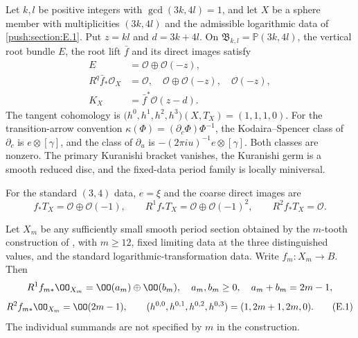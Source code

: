 \begin{theorem}\hypertarget{tag-032U}{}\label{push:src:E.2.1}
\hypertarget{tag-01RH}{}\label{fam:src:A.5.2}\label{fam:st:A.5.2}\label{inv:D1.3}\label{inv:D2.1}\label{inv:D3.1}\label{cdp:st:E9}
\hypertarget{tag-02YO}{}\label{night:P5.3}\label{stmt:P5.3}
\hypertarget{tag-02YP}{}\label{night:P5.4}\label{stmt:P5.4}

Let $k,l$ be positive integers with $\gcd(3k,4l)=1$, and let $X$
be a sphere member with multiplicities $(3k,4l)$ and the admissible
logarithmic data of \cref{push:section:E.1}. Put $z=kl$ and
$d=3k+4l$. On $\mathfrak B_{k,l}=\mathbb P(3k,4l)$, the vertical
root bundle $E$, the root lift $\bar f$ and its direct images satisfy
\[
 \begin{split}
 E&=\mathcal O\oplus\mathcal O(-z),\\
 R^q\bar f_*\mathcal O_X&=
 \mathcal O,\quad\mathcal O\oplus\mathcal O(-z),\quad\mathcal O(-z),\\
 K_X&=\bar f^*\mathcal O(z-d).
 \end{split}
\]
The tangent cohomology is
$\bigl(h^0,h^1,h^2,h^3\bigr)(X,T_X)=(1,1,1,0)$.
For the transition-arrow convention
$\kappa(\Phi)=(\partial_c\Phi)\Phi^{-1}$, the Kodaira--Spencer
class of $\partial_c$ is $e\otimes[\gamma]$, and the class of
$\partial_u$ is $-(2\pi i u)^{-1}e\otimes[\gamma]$.
Both classes are nonzero. The primary Kuranishi bracket vanishes,
the Kuranishi germ is a smooth reduced disc, and the fixed-data
period family is locally miniversal.

For the standard $(3,4)$ data, $e=\xi$ and the coarse direct
images are
\begin{equation}
 f_*T_X=\mathcal O\oplus\mathcal O(-1),\qquad
 R^1f_*T_X=\mathcal O\oplus\mathcal O(-1)^2,\qquad
 R^2f_*T_X=\mathcal O.
\label{pub:I:eq:D-4}
\end{equation}
\end{theorem}

\begin{proposition}\label{inv:E2.1}
Let $X_m$ be any sufficiently small smooth period section obtained by
the $m$-tooth construction of
\citet[Theorem 1.1]{ViaclovskyCombs2026}, with
$m\ge12$, fixed limiting data at the three distinguished values, and
the standard logarithmic-transformation data. Write
$f_m:X_m\to B$. Then
\[
 R^1f_{m*}\OO_{X_m}=\OO(a_m)\oplus\OO(b_m),\quad
 a_m,b_m\ge0,\quad a_m+b_m=2m-1,
\]
\[
 R^2f_{m*}\OO_{X_m}=\OO(2m-1),\qquad
 (h^{0,0},h^{0,1},h^{0,2},h^{0,3})=(1,2m+1,2m,0).      \tag{E.1}\label{invII:eq:E.1}
\]
The individual summands are not specified by $m$ in the construction.
\end{proposition}

